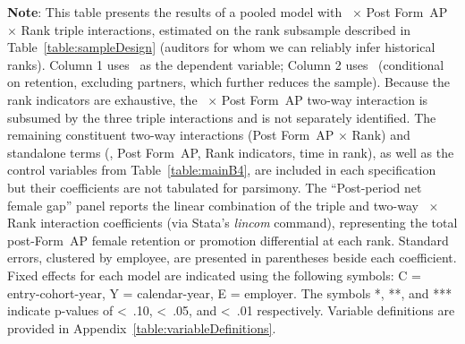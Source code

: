\documentclass[11pt]{article}
\begin{document}
\clearpage
\begin{table}[!htbp]
\begin{flushleft}
    \begin{threeparttable}[b]

        \captionsetup{labelfont=bf, singlelinecheck=off, justification=raggedright, labelsep=none}
        \caption{: Female retention and promotion by audit rank}

        

        \begin{tablenotes}
            \footnotesize
            \item \textbf{Note}: This table presents the results of a pooled model with \FEMALE\ $\times$ Post Form~AP $\times$ Rank triple interactions, estimated on the rank subsample described in Table~\ref{table:sampleDesign} (auditors for whom we can reliably infer historical ranks). Column 1 uses \RETAINED\ as the dependent variable; Column 2 uses \PROMOTED\ (conditional on retention, excluding partners, which further reduces the sample). Because the rank indicators are exhaustive, the \FEMALE\ $\times$ Post Form~AP two-way interaction is subsumed by the three triple interactions and is not separately identified. The remaining constituent two-way interactions (Post Form~AP $\times$ Rank) and standalone terms (\FEMALE, Post Form~AP, Rank indicators, time in rank), as well as the control variables from Table~\ref{table:mainB4}, are included in each specification but their coefficients are not tabulated for parsimony. The ``Post-period net female gap'' panel reports the linear combination of the triple and two-way \FEMALE\ $\times$ Rank interaction coefficients (via Stata's \textit{lincom} command), representing the total post-Form~AP female retention or promotion differential at each rank. Standard errors, clustered by employee, are presented in parentheses beside each coefficient. Fixed effects for each model are indicated using the following symbols: C = entry-cohort-year, Y = calendar-year, E = employer. The symbols *, **, and *** indicate p-values of \textless\, .10, \textless\, .05, and \textless\, .01 respectively. Variable definitions are provided in Appendix~\ref{table:variableDefinitions}.
        \end{tablenotes}
        \label{table:rankInteraction}
    \end{threeparttable}
\end{flushleft}
\end{table}
\end{document}
